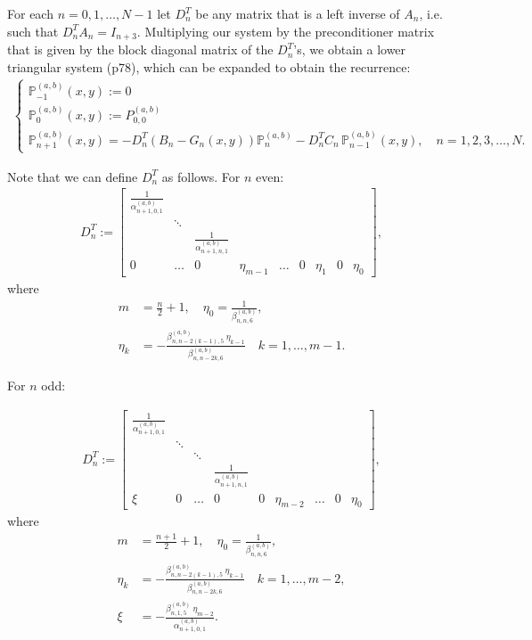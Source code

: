 \documentclass[11pt, oneside]{article}   	%
\newcommand{\bigP}{\mathbb{P}}
\newcommand{\alphaab}{\alpha^{(a,b)}}
\newcommand{\betaab}{\beta^{(a,b)}}
\newcommand{\bigPab}{\bigP^{(a,b)}}
\newcommand{\Dnt}{D^T_n}
\begin{document}
For each \(n = 0,1,\dots,N-1\) let \(\Dnt\) be any matrix that is a left inverse of \(A_n\), i.e. such that \(\Dnt A_n = I_{n+3}\). Multiplying our system by the preconditioner matrix that is given by the block diagonal matrix of the \(\Dnt\)'s, we obtain a lower triangular system \citep{dunkl2014orthogonal} (p78), which can be expanded to obtain the recurrence:
\begin{align}
\begin{cases}
\bigPab_{-1}(x,y) := 0 \\
\bigPab_{0}(x,y) := P^{(a,b)}_{0,0} \\
\bigPab_{n+1}(x,y) = -\Dnt (B_n-G_n(x,y)) \bigPab_n - \Dnt C_n  \,\bigPab_{n-1}(x,y), \quad n = 1,2,3,\dots,N.
\end{cases}
\end{align}

Note that we can define \(\Dnt\) as follows. For \(n\) even:
\begin{align}
\Dnt := \begin{bmatrix}
		\frac{1}{\alphaab_{n+1,0,1}} & & &  \\
		& \ddots & & & \\
		& & \frac{1}{\alphaab_{n+1,n,1}} & \\
		0 & \hdots & 0 & \eta_{m-1} & \hdots & 0 & \eta_1 & 0 & \eta_0
	    \end{bmatrix},
\end{align}
where
\begin{align}
m &= \frac{n}{2} + 1, \quad \eta_0 = \frac{1}{\betaab_{n,n,6}}, \nonumber \\
\eta_k &= -\frac{\betaab_{n,n-2(k-1),5} \: \eta_{k-1}}{\betaab_{n,n-2k,6}} \quad k = 1,\dots,m-1.
\end{align}

For \(n\) odd:

\begin{align}
\Dnt := \begin{bmatrix}
		\frac{1}{\alphaab_{n+1,0,1}} & &  \\
		& \ddots & & &  \\
		& & \ddots & & \\
		& & & \frac{1}{\alphaab_{n+1,n,1}} & \\
		\xi & 0 & \hdots & 0 & 0 & \eta_{m-2} & \hdots & 0 & \eta_0
	    \end{bmatrix},
\end{align}
 where
\begin{align}
m &= \frac{n+1}{2} + 1, \quad \eta_0 = \frac{1}{\betaab_{n,n,6}}, \nonumber \\
\eta_k &= -\frac{\betaab_{n,n-2(k-1),5} \: \eta_{k-1}}{\betaab_{n,n-2k,6}} \quad k = 1,\dots,m-2, \\
\xi &= -\frac{\betaab_{n,1,5} \: \eta_{m-2}}{\alphaab_{n+1,0,1}}. \nonumber
\end{align}
\end{document}
